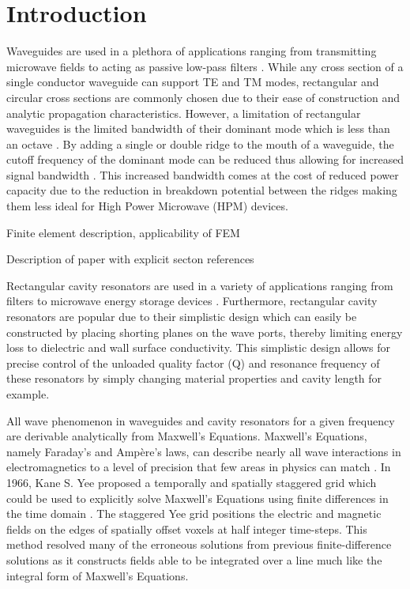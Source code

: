 \section{Introduction}
\label{sec:intro}

Waveguides are used in a plethora of applications ranging from transmitting microwave fields to acting as passive low-pass filters \cite{pozar2011microwave}. While any cross section of a single conductor waveguide can support TE and TM modes, rectangular and circular cross sections are commonly chosen due to their ease of construction and analytic propagation characteristics. However, a limitation of rectangular waveguides is the limited bandwidth of their dominant mode which is less than an octave \cite{pozar2011microwave}. By adding a single or double ridge to the mouth of a waveguide, the cutoff frequency of the dominant mode can be reduced thus allowing for increased signal bandwidth \cite{pozar2011microwave}. This increased bandwidth comes at the cost of reduced power capacity due to the reduction in breakdown potential between the ridges \cite{pozar2011microwave} making them less ideal for High Power Microwave (HPM) devices.  

Finite element description, applicability of FEM



Description of paper with explicit secton references



Rectangular cavity resonators are used in a variety of applications ranging from filters to microwave energy storage devices \cite{pozar2011microwave}. Furthermore, rectangular cavity resonators are popular due to their simplistic design which can easily be constructed by placing shorting planes on the wave ports, thereby limiting energy loss to dielectric and wall surface conductivity\cite{pozar2011microwave}. This simplistic design allows for precise control of the unloaded quality factor (Q) and resonance frequency of these resonators by simply changing material properties and cavity length for example.

All wave phenomenon in waveguides and cavity resonators for a given frequency are derivable analytically from Maxwell's Equations. Maxwell's Equations, namely Faraday's and Amp\`{e}re's laws, can describe nearly all wave interactions in electromagnetics to a level of precision that few areas in physics can match \cite{rothlecnotes}. In 1966, Kane S. Yee proposed a temporally and spatially staggered grid which could be used to explicitly solve Maxwell's Equations using finite differences in the time domain \cite{yee}. The staggered Yee grid positions the electric and magnetic fields on the edges of spatially offset voxels at half integer time-steps\cite{yee}. This method resolved many of the erroneous solutions from previous finite-difference solutions as it constructs fields able to be integrated over a line\cite{rothlecnotes} much like the integral form of Maxwell's Equations.

